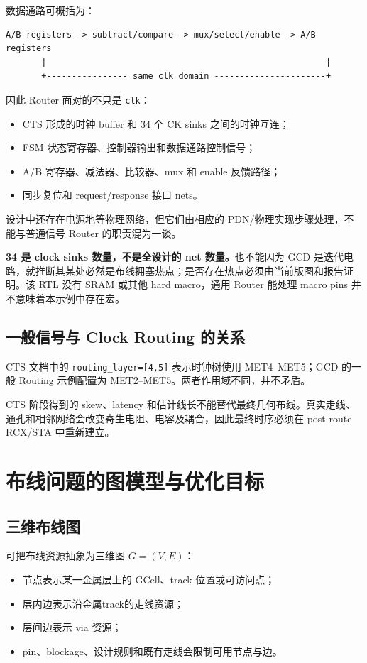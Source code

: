 \documentclass[UTF8,a4paper,11pt,fontset=fandol]{ctexart}
\newcommand{\code}[1]{\nolinkurl{#1}}
\begin{document}
数据通路可概括为：
\begin{verbatim}
A/B registers -> subtract/compare -> mux/select/enable -> A/B registers
       |                                                       |
       +---------------- same clk domain ----------------------+
\end{verbatim}

因此 Router 面对的不只是 \code{clk}：
\begin{itemize}
  \item CTS 形成的时钟 buffer 和 34 个 CK sinks 之间的时钟互连；
  \item FSM 状态寄存器、控制器输出和数据通路控制信号；
  \item A/B 寄存器、减法器、比较器、mux 和 enable 反馈路径；
  \item 同步复位和 request/response 接口 nets。
\end{itemize}

设计中还存在电源地等物理网络，但它们由相应的 PDN/物理实现步骤处理，不能与普通信号 Router 的职责混为一谈。

\textbf{34 是 clock sinks 数量，不是全设计的 net 数量。}也不能因为 GCD 是迭代电路，就推断其某处必然是布线拥塞热点；是否存在热点必须由当前版图和报告证明。该 RTL 没有 SRAM 或其他 hard macro，通用 Router 能处理 macro pins 并不意味着本示例中存在宏。

\subsection{一般信号与 Clock Routing 的关系}

CTS 文档中的 \code{routing_layer=[4,5]} 表示时钟树使用 MET4--MET5；GCD 的一般 Routing 示例配置为 MET2--MET5。两者作用域不同，并不矛盾。

CTS 阶段得到的 skew、latency 和估计线长不能替代最终几何布线。真实走线、通孔和相邻网络会改变寄生电阻、电容及耦合，因此最终时序必须在 post-route RCX/STA 中重新建立。

\section{布线问题的图模型与优化目标}

\subsection{三维布线图}

可把布线资源抽象为三维图 $G=(V,E)$：
\begin{itemize}
  \item 节点表示某一金属层上的 GCell、track 位置或可访问点；
  \item 层内边表示沿金属track的走线资源；
  \item 层间边表示 via 资源；
  \item pin、blockage、设计规则和既有走线会限制可用节点与边。
\end{itemize}
\end{document}
